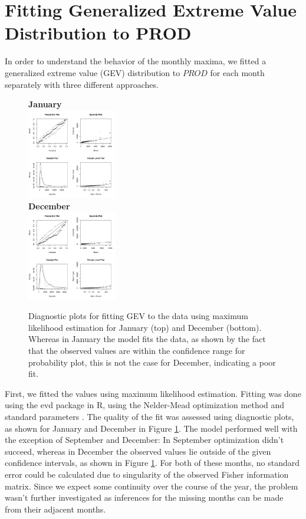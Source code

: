 \documentclass[10pt,conference,compsocconf]{IEEEtran}
\begin{document}
\section*{Fitting Generalized Extreme Value Distribution to PROD}
In order to understand the behavior of the monthly maxima, we fitted a generalized extreme value (GEV) distribution to $PROD$ for each month separately with three different approaches. 
\begin{figure}
	\centering
	\textbf{January}\\
	\includegraphics[width=0.35\textwidth]{../plots/monthly_mle_diag/01_monthly_mle_diag.pdf}\\
	\textbf{December}\\
	\includegraphics[width=0.35\textwidth]{../plots/monthly_mle_diag/12_monthly_mle_diag.pdf}
	\caption{Diagnostic plots for fitting GEV to the data using maximum likelihood estimation for January (top) and December (bottom). Whereas in January the model fits the data, as shown by the fact that the observed values are within the confidence range for probability plot, this is not the case for December, indicating a poor fit.}
	\label{fig:mle_diag}
\end{figure}
\par
First, we fitted the values using maximum likelihood estimation. Fitting was done using the evd package in R, using the Nelder-Mead optimization method and standard parameters \cite{evd}. The quality of the fit was assessed using diagnostic plots, as shown for January and December in Figure \ref{fig:mle_diag}. The model performed well with the exception of September and December: In September optimization didn't succeed, whereas in December the observed values lie outside of the given confidence intervals, as shown in Figure \ref{fig:mle_diag}. For both of these months, no standard error could be calculated due to singularity of the observed Fisher information matrix. Since we expect some continuity over the course of the year, the problem wasn't further investigated as inferences for the missing months can be made from their adjacent months. 
\end{document}

